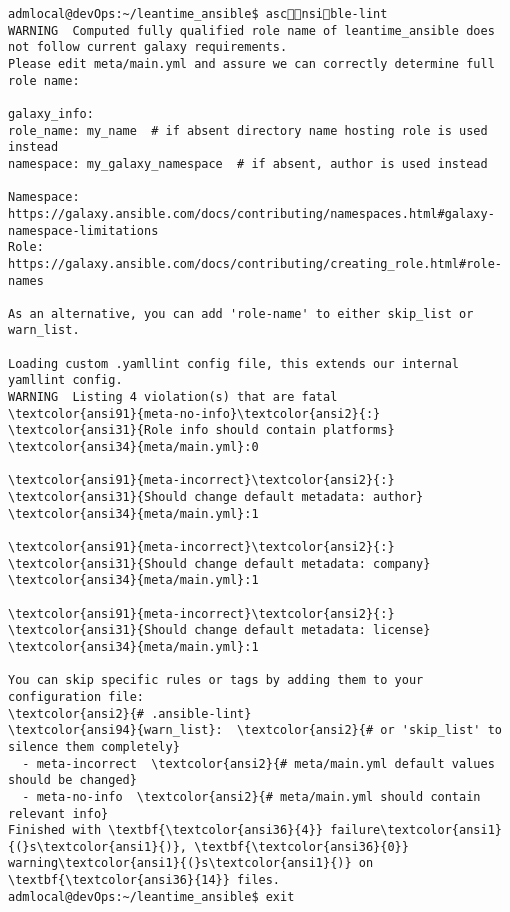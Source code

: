 \documentclass{scrartcl}
\title{}
\begin{document}
\begin{Verbatim}
admlocal@devOps:~/leantime_ansible$ ascnsible-lint 
WARNING  Computed fully qualified role name of leantime_ansible does not follow current galaxy requirements.
Please edit meta/main.yml and assure we can correctly determine full role name:

galaxy_info:
role_name: my_name  # if absent directory name hosting role is used instead
namespace: my_galaxy_namespace  # if absent, author is used instead

Namespace: https://galaxy.ansible.com/docs/contributing/namespaces.html#galaxy-namespace-limitations
Role: https://galaxy.ansible.com/docs/contributing/creating_role.html#role-names

As an alternative, you can add 'role-name' to either skip_list or warn_list.

Loading custom .yamllint config file, this extends our internal yamllint config.
WARNING  Listing 4 violation(s) that are fatal
\textcolor{ansi91}{meta-no-info}\textcolor{ansi2}{:} \textcolor{ansi31}{Role info should contain platforms}
\textcolor{ansi34}{meta/main.yml}:0

\textcolor{ansi91}{meta-incorrect}\textcolor{ansi2}{:} \textcolor{ansi31}{Should change default metadata: author}
\textcolor{ansi34}{meta/main.yml}:1

\textcolor{ansi91}{meta-incorrect}\textcolor{ansi2}{:} \textcolor{ansi31}{Should change default metadata: company}
\textcolor{ansi34}{meta/main.yml}:1

\textcolor{ansi91}{meta-incorrect}\textcolor{ansi2}{:} \textcolor{ansi31}{Should change default metadata: license}
\textcolor{ansi34}{meta/main.yml}:1

You can skip specific rules or tags by adding them to your configuration file:
\textcolor{ansi2}{# .ansible-lint}
\textcolor{ansi94}{warn_list}:  \textcolor{ansi2}{# or 'skip_list' to silence them completely}
  - meta-incorrect  \textcolor{ansi2}{# meta/main.yml default values should be changed}
  - meta-no-info  \textcolor{ansi2}{# meta/main.yml should contain relevant info}
Finished with \textbf{\textcolor{ansi36}{4}} failure\textcolor{ansi1}{(}s\textcolor{ansi1}{)}, \textbf{\textcolor{ansi36}{0}} warning\textcolor{ansi1}{(}s\textcolor{ansi1}{)} on \textbf{\textcolor{ansi36}{14}} files.
admlocal@devOps:~/leantime_ansible$ exit

\end{Verbatim}
\end{document}
